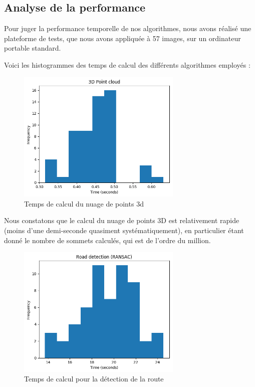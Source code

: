 \documentclass[titlepage,11pt,a4paper]{article}
\begin{document}
\subsection{Analyse de la performance}
\par Pour juger la performance temporelle de nos algorithmes, nous avons réalisé une plateforme de tests, que nous avons appliquée à 57 images, sur un ordinateur portable standard.
\par Voici les histogrammes des temps de calcul des différents algorithmes employés : 
\begin{figure}[H]
  \centering
    \includegraphics[width=0.7\textwidth]{images/3D_Point_cloud.png}
  \caption{Temps de calcul du nuage de points 3d}
\end{figure}

\par Nous constatons que le calcul du nuage de points 3D est relativement rapide (moins d'une demi-seconde quasiment systématiquement), en particulier étant donné le nombre de sommets calculés, qui est de l'ordre du million.


\begin{figure}[H]
  \centering
    \includegraphics[width=0.7\textwidth]{images/Road_detection_(RANSAC).png}
  \caption{Temps de calcul pour la détection de la route}
\end{figure}
\end{document}
